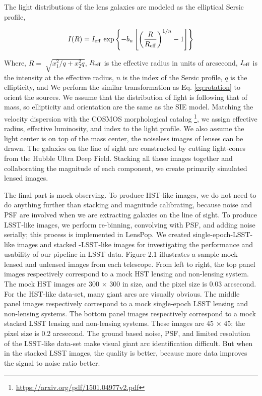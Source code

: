 \documentclass{emulateapj}
\begin{document}
The light distributions of the lens galaxies  are modeled as the elliptical Sersic profile,

\begin{equation}
I(R) = I_{\rm eff}~{\rm exp} \left\lbrace -b_{n} \left[ \left(
  \frac{R}{R_{\rm eff}}\right)^{1/n} - 1 \right ] \right\rbrace
\end{equation}


Where, $R = \sqrt[]{x_1^2 /q+x_2^2 q }$, $R_{\rm eff}$ is the
effective radius in units of arcsecond, $I_{\rm eff}$ is the intensity
at the effective radius, $n$ is the index of the Sersic profile, $q$
is the ellipticity, and We perform the similar transformation as
Eq. \ref{eq:rotation} to orient the sources.  We assume that the
distribution of light is following that of mass, so ellipticity and
orientation are the same as the SIE model. Matching the velocity
dispersion with the COSMOS morphological
catalog \footnote{\url{https://arxiv.org/pdf/1501.04977v2.pdf}}, we
assign effective radius, effective luminosity, and index to the light
profile.  We also assume the light center is on top of the mass
center, the noiseless images of lenses can be drawn. The galaxies on
the line of sight are constructed by cutting light-cones from the
Hubble Ultra Deep Field.  Stacking all these images together and
collaborating the magnitude of each component, we create primarily
simulated lensed images.

The final part is mock observing. To produce HST-like images, we do
not need to do anything further than stacking and magnitude
calibrating, because noise and PSF are involved when we are extracting
galaxies on the line of sight. To produce LSST-like images, we perform
re-binning, convolving with PSF, and adding noise serially; this
process is implemented in LensPop. We created single-epoch-LSST-like
images and stacked -LSST-like images for investigating the performance
and usability of our pipeline in LSST data. Figure 2.1 illustrates a
sample mock lensed and unlensed images from each telescope. From left
to right, the top panel images respectively correspond to a mock HST
lensing and non-lensing system. The mock HST images are 300 × 300 in
size, and the pixel size is 0.03 arcsecond. For the HST-like data-set,
many giant arcs are visually obvious. The middle panel images
respectively correspond to a mock single-epoch LSST lensing and
non-lensing systems. The bottom panel images respectively correspond
to a mock stacked LSST lensing and non-lensing systems. These images
are 45 × 45; the pixel size is 0.2 arcsecond. The ground based noise,
PSF, and limited resolution of the LSST-like data-set make visual
giant arc identification difficult. But when in the stacked LSST
images, the quality is better, because more data improves the signal
to noise ratio better.
\end{document}

